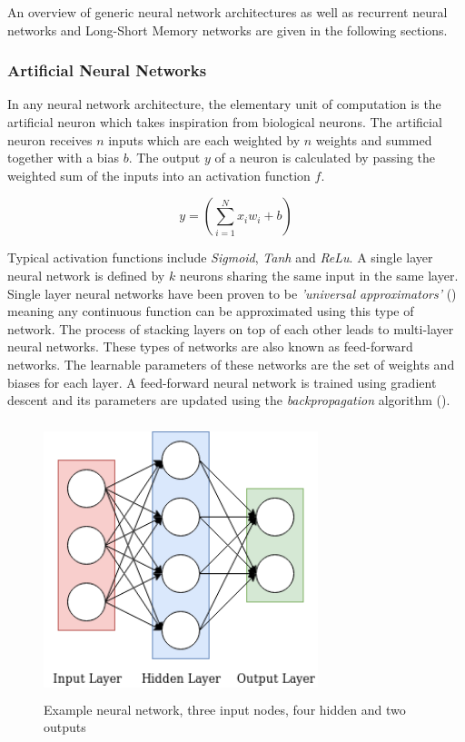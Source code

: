 \noindent
\newline
An overview of generic neural network architectures as well as recurrent neural networks and Long-Short Memory networks are given in the following sections.

\subsubsection{Artificial Neural Networks}
In any neural network architecture, the elementary unit of computation is the artificial neuron which takes inspiration from biological neurons. The artificial neuron receives \(n\) inputs which are each weighted by \(n\) weights and summed together with a bias \(b\). The output \(y\) of a neuron is calculated by passing the weighted sum of the inputs into an activation function \(f\). 

\begin{equation}
	y = \left( \sum_{i=1}^{N} x_{i}w_{i} + b\right)
\end{equation}

\noindent
\newline
Typical activation functions include \textit{Sigmoid}, \textit{Tanh} and \textit{ReLu}. A single layer neural network is defined by \(k\) neurons sharing the same input in the same layer. Single layer neural networks have been proven to be \textit{'universal approximators'} (\cite{Hornik1989}) meaning any continuous function can be approximated using this type of network. The process of stacking layers on top of each other leads to multi-layer neural networks. These types of networks are also known as feed-forward networks. The learnable parameters of these networks are the set of weights and biases for each layer. A feed-forward neural network is trained using gradient descent and its parameters are updated using the \textit{backpropagation} algorithm (\cite{Rumelhart1988}).

\begin{figure}[h]
	\includegraphics[width=8cm, height=8cm]{./figures/fig2}
	\centering
	\caption{Example neural network, three input nodes, four hidden and two outputs}
	\label{fig:fig2}
\end{figure}


